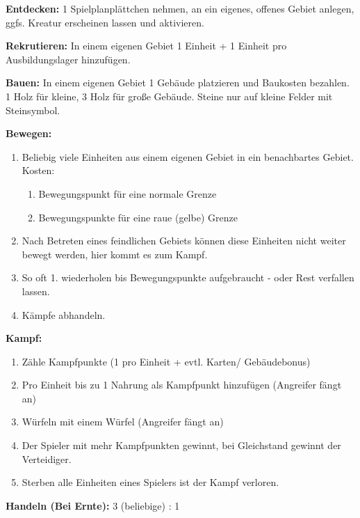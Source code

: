 \documentclass[6pt]{scrreprt}
\begin{document}
  \textbf{Entdecken:}
  1 Spielplanplättchen nehmen, an ein eigenes, offenes Gebiet anlegen, ggfs. Kreatur erscheinen lassen und aktivieren.

  \textbf{Rekrutieren:}
  In einem eigenen Gebiet 1 Einheit + 1 Einheit pro Ausbildungslager hinzufügen.

  \textbf{Bauen:}
  In einem eigenen Gebiet 1 Gebäude platzieren und Baukosten bezahlen. 1 Holz für kleine, 3 Holz für große Gebäude. Steine nur auf kleine Felder mit Steinsymbol.

  \textbf{Bewegen:}
  \begin{enumerate}[topsep=1pt, partopsep=0pt, parsep=0pt, itemsep=0pt, leftmargin=12pt]
    \item Beliebig viele Einheiten aus einem eigenen Gebiet in ein benachbartes Gebiet. Kosten:
    \begin{enumerate}[label=\textbf{\arabic*x}, topsep=0pt, partopsep=0pt, parsep=0pt, itemsep=0pt, leftmargin=10pt]
      \item Bewegungspunkt für eine normale Grenze
      \item Bewegungspunkte für eine raue (gelbe) Grenze
    \end{enumerate}
    \item Nach Betreten eines feindlichen Gebiets können diese Einheiten nicht weiter bewegt werden, hier kommt es zum Kampf.
    \item So oft 1. wiederholen bis Bewegungspunkte aufgebraucht - oder Rest verfallen lassen.
    \item Kämpfe abhandeln.
  \end{enumerate}

  \textbf{Kampf:}
  \begin{enumerate}[topsep=1pt, partopsep=0pt, parsep=0pt, itemsep=0pt, leftmargin=12pt]
    \item Zähle Kampfpunkte (1 pro Einheit + evtl. Karten/ Gebäudebonus)
    \item Pro Einheit bis zu 1 Nahrung als Kampfpunkt hinzufügen (Angreifer fängt an)
    \item Würfeln mit einem Würfel (Angreifer fängt an)
    \item Der Spieler mit mehr Kampfpunkten gewinnt, bei Gleichstand gewinnt der Verteidiger.
    \item Sterben alle Einheiten eines Spielers ist der Kampf verloren.
  \end{enumerate}

  \textbf{Handeln (Bei Ernte):} 3 (beliebige) : 1
\end{document}

